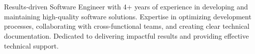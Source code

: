 \section{}
\small{Results-driven Software Engineer with 4+ years of experience in developing and maintaining high-quality software solutions. Expertise in optimizing development processes, collaborating with cross-functional teams, and creating clear technical documentation. Dedicated to delivering impactful results and providing effective technical support.}